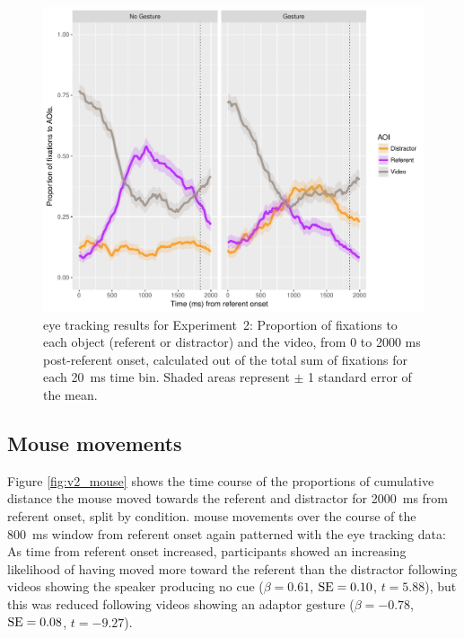 \documentclass[a4paper,man,natbib]{apa6}
\newcommand{\resultsLM}[3]{$\beta = #1$, $\textnormal{SE} = #2$, $t #3$}
\begin{document}
\begin{figure}[Ht]
  \centering
	\includegraphics[width=\linewidth]{./img/e8_fixations.pdf}
  \caption{eye tracking results for Experiment~2: Proportion of fixations to each object (referent or distractor) and the video, from 0 to 2000 ms post-referent onset, calculated out of the total sum of fixations for each 20~ms time bin. Shaded areas represent $\pm$ 1 standard error of the mean.}
  \label{fig:v2_eye}
\end{figure}

\subsection{Mouse movements}
Figure \ref{fig:v2_mouse} shows the time course of the proportions of cumulative distance the mouse moved towards the referent and distractor for 2000~ms from referent onset, split by condition.
mouse movements over the course of the 800~ms window from referent onset again patterned with the eye tracking data:
As time from referent onset increased, participants showed an increasing likelihood of having moved more toward the referent than the distractor following videos showing the speaker producing no cue (\resultsLM{0.61}{0.10}{=5.88}), but this was reduced following videos showing an adaptor gesture (\resultsLM{-0.78}{0.08}{=-9.27}).
\end{document}
